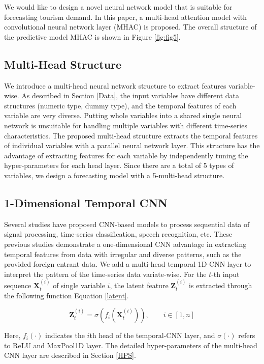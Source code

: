 \documentclass[conference]{IEEEtran}
\begin{document}
We would like to design a novel neural network model that is suitable for forecasting tourism demand. In this paper, a multi-head attention model with convolutional neural network layer (MHAC) is proposed. The overall structure of the predictive model MHAC is shown in Figure \ref{fig:fig5}.

\subsection{Multi-Head Structure} We introduce a multi-head neural network structure to extract features variable-wise. As described in Section \ref{Data}, the input variables have different data structures (numeric type, dummy type), and the temporal features of each variable are very diverse. Putting whole variables into a shared single neural network is unsuitable for handling multiple variables with different time-series characteristics. The proposed multi-head structure extracts the temporal features of individual variables with a parallel neural network layer. This structure has the advantage of extracting features for each variable by independently tuning the hyper-parameters for each head layer. Since there are a total of 5 types of variables, we design a forecasting model with a 5-multi-head structure.

\subsection{1-Dimensional Temporal CNN}

Several studies \cite{oord2016wavenet, cho2018divide, zhao2017convolutional, bai2018empirical} have proposed CNN-based models to process sequential data of signal processing, time-series classification, speech recognition, etc. These previous studies demonstrate a one-dimensional CNN advantage in extracting temporal features from data with irregular and diverse patterns, such as the provided foreign entrant data. We add a multi-head temporal 1D-CNN layer to interpret the pattern of the time-series data variate-wise. For the \(t\)-th input sequence \(\mathbf{X}_t^{(i)}\) of single variable \(i\), the latent feature \(\mathbf{Z}_t^{(i)}\) is extracted through the following function Equation \eqref{latent}.

\begin{equation}
\mathbf{Z}_t^{(i)} = \sigma(f_i(\mathbf{X}_t^{(i)})), \qquad i \in [1, n] \label{latent}
\end{equation}

\noindent Here, \(f_i(\cdot)\) indicates the \(i\)th head of the temporal-CNN layer, and \(\sigma(\cdot)\) refers to ReLU and MaxPool1D layer. The detailed hyper-parameters of the multi-head CNN layer are described in Section \ref{HPS}.
\end{document}
